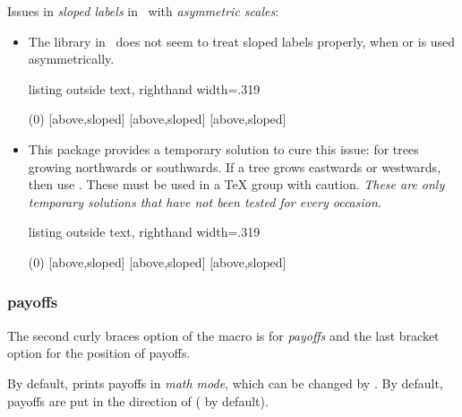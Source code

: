 \warning \label{page:slopedlabels-warning}
Issues in \emph{sloped labels} in \TikZ\ with \emph{asymmetric scales}:
\begin{itemize}\tightlist
\item The  library in \TikZ\ does not seem to treat sloped labels properly, when  or  is used asymmetrically.

\begin{tcblisting}{listing outside text, righthand width=.319\linewidth}
\begin{istgame}[xscale=2,font=\footnotesize]
\istroot(0)
  [above,sloped]
  [above,sloped]
  [above,sloped]
  \endist
\end{istgame}
\end{tcblisting}

\item This package provides a temporary solution to cure this issue: \icmd{\xtcureslopedlabelsNS} for trees growing northwards or southwards. If a tree grows eastwards or westwards, then use \icmd{\xtcureslopedlabelsEW}.
These must be used in a TeX group with caution.
\emph{These are only temporary solutions that have not been tested for every occasion}.

\begin{tcblisting}{listing outside text, righthand width=.319\linewidth}
\begin{istgame}[xscale=2,font=\footnotesize]
\xtcureslopedlabelsNS
\istroot(0)
  [above,sloped]
  [above,sloped]
  [above,sloped]
  \endist
\end{istgame}
\end{tcblisting}
\end{itemize}

\subsubsection*{payoffs}

The second curly braces option of the macro \cmd{\istb} is for \emph{payoffs} and the last bracket option for the position of payoffs.

By default, \cmd{\istb} prints payoffs in \emph{math mode}, which can be changed by \cmd{\setistmathTF(*)}.
By default, payoffs are put in the direction of \cmd{\istgrowdirection} (\xw{[south]} by default).

